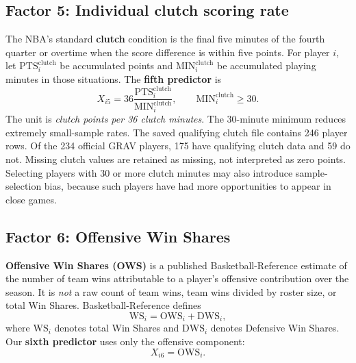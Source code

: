 \documentclass[11pt]{article}
\begin{document}
\subsection{Factor 5: Individual clutch scoring rate}
The NBA's standard \textbf{clutch} condition is the final five minutes
of the fourth quarter or overtime when the score difference is within
five points. For player $i$, let $\mathrm{PTS}^{\mathrm{clutch}}_i$
be accumulated points and $\mathrm{MIN}^{\mathrm{clutch}}_i$
be accumulated playing minutes in those situations. The
\textbf{fifth predictor} is
\begin{equation}
 \boxed{X_{i5}=36\frac{\mathrm{PTS}^{\mathrm{clutch}}_i}
 {\mathrm{MIN}^{\mathrm{clutch}}_i}},
 \qquad \mathrm{MIN}^{\mathrm{clutch}}_i\ge 30.
 \label{eq:clutch}
\end{equation}
The unit is \emph{clutch points per 36 clutch minutes}. The 30-minute minimum reduces extremely small-sample rates. The
saved qualifying clutch file contains 246 player rows. Of the 234 official
GRAV players, 175 have qualifying clutch data and 59 do not. Missing
clutch values are retained as missing, not interpreted as zero points.
Selecting players with 30 or more clutch minutes may also introduce
sample-selection bias, because such players have had more opportunities
to appear in close games.

\subsection{Factor 6: Offensive Win Shares}
\textbf{Offensive Win Shares (OWS)} is a published Basketball-Reference
estimate of the number of team wins attributable to a player's offensive
contribution over the season. It is \emph{not} a raw count of team wins,
team wins divided by roster size, or total Win Shares.
Basketball-Reference defines
\begin{equation}
 \mathrm{WS}_i=\mathrm{OWS}_i+\mathrm{DWS}_i,
 \label{eq:winshares}
\end{equation}
where $\mathrm{WS}_i$ denotes total Win Shares and $\mathrm{DWS}_i$
denotes Defensive Win Shares. Our \textbf{sixth predictor} uses only the
offensive component:
\begin{equation}
 \boxed{X_{i6}=\mathrm{OWS}_i.}
 \label{eq:ws-predictor}
\end{equation}
\end{document}
